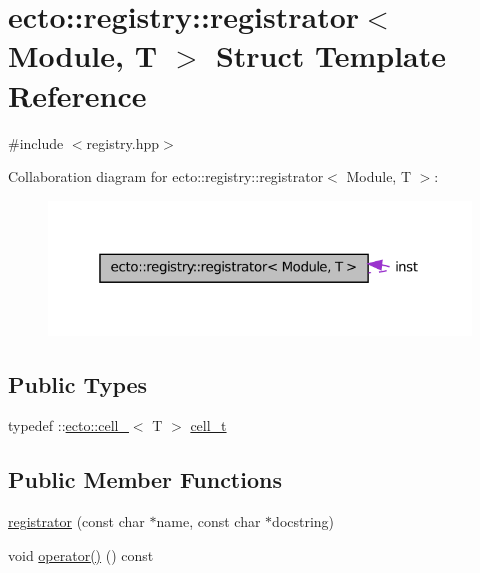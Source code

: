 \hypertarget{structecto_1_1registry_1_1registrator}{\section{ecto\-:\-:registry\-:\-:registrator$<$ \-Module, \-T $>$ \-Struct \-Template \-Reference}
\label{structecto_1_1registry_1_1registrator}
}


{\ttfamily \#include $<$registry.\-hpp$>$}



\-Collaboration diagram for ecto\-:\-:registry\-:\-:registrator$<$ \-Module, \-T $>$\-:\nopagebreak
\begin{figure}[H]
\begin{center}
\leavevmode
\includegraphics[width=321pt]{structecto_1_1registry_1_1registrator__coll__graph}
\end{center}
\end{figure}
\subsection*{\-Public \-Types}
\begin{DoxyCompactItemize}
\item 
typedef \-::\hyperlink{structecto_1_1cell__}{ecto\-::cell\-\_\-}$<$ \-T $>$ \hyperlink{structecto_1_1registry_1_1registrator_ae352ebfb18c87dc7fb3f649ecbe445fa}{cell\-\_\-t}
\end{DoxyCompactItemize}
\subsection*{\-Public \-Member \-Functions}
\begin{DoxyCompactItemize}
\item 
\hyperlink{structecto_1_1registry_1_1registrator_a3c8bafa2e65ef88c572c1779fb05fd12}{registrator} (const char $\ast$name, const char $\ast$docstring)
\item 
void \hyperlink{structecto_1_1registry_1_1registrator_a11572913b91238e8d6415bb89cc7ac1a}{operator()} () const 
\end{DoxyCompactItemize}
